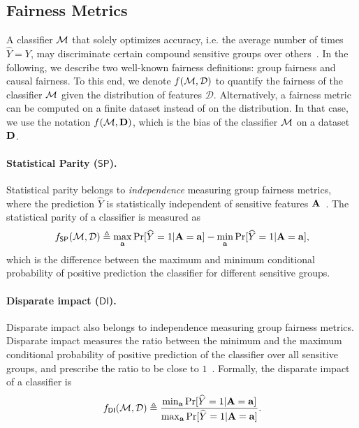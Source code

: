 \subsection{Fairness Metrics}

A classifier $\mathcal{M}$ that solely optimizes accuracy, i.e. the average number of times $\widehat{Y} = Y$, may discriminate certain compound sensitive groups over others~\cite{chouldechova2020snapshot}. In the following, we describe two well-known fairness definitions: group fairness and causal fairness. To this end, we denote $ f(\mathcal{M}, \mathcal{D}) $ to quantify the fairness of the classifier $ \mathcal{M} $ given the distribution of features $ \mathcal{D} $. Alternatively, a fairness metric can be computed on a finite dataset instead of on the distribution. In that case, we use the notation $ f(\mathcal{M}, \mathbf{D}) $, which is the bias of the classifier $ \mathcal{M} $ on a dataset $ \mathbf{D} $. 

\paragraph{Statistical Parity ($ \mathsf{SP} $).} Statistical parity belongs to \textit{independence} measuring group fairness metrics, where the prediction $ \widehat{Y} $ is statistically independent of sensitive features $ \mathbf{A} $~\cite{feldman2015certifying}.  The statistical parity of  a classifier is measured as 
\[ f_{\mathsf{SP}}(\mathcal{M}, \mathcal{D}) \triangleq \max_{\mathbf{a}}\Pr[\widehat{Y} =1 | \mathbf{A} = \mathbf{a}] - \min_{\mathbf{a}}\Pr[\widehat{Y} =1 | \mathbf{A} = \mathbf{a}], \] which is the difference between the maximum and minimum conditional probability of positive prediction the classifier for different sensitive groups.


\paragraph{Disparate impact ($ \mathsf{DI} $).} Disparate impact also belongs to independence measuring group fairness metrics. Disparate impact measures the ratio between the minimum and the maximum conditional probability of positive prediction of the classifier over all sensitive groups, and prescribe the ratio to be close to $1$~\cite{feldman2015certifying}.  Formally, the disparate impact of a classifier is 
\[
f_{\mathsf{DI}}(\mathcal{M}, \mathcal{D}) \triangleq \frac{\min_{\mathbf{a}} \Pr[\widehat{Y} =1 | \mathbf{A} =  \mathbf{a}]}{\max_{\mathbf{a}} \Pr[\widehat{Y} =1 | \mathbf{A} =  \mathbf{a}]}.
\]



